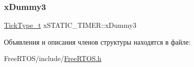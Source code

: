 \mbox{\label{structx_s_t_a_t_i_c___t_i_m_e_r_a60d582d1d0b5b9b15e8050d5ae29bc30}} 
\subsubsection{\texorpdfstring{xDummy3}{xDummy3}}
{\footnotesize\ttfamily \mbox{\hyperlink{portmacro_8h_aa69c48c6e902ce54f70886e6573c92a9}{Tick\+Type\+\_\+t}} x\+S\+T\+A\+T\+I\+C\+\_\+\+T\+I\+M\+E\+R\+::x\+Dummy3}



Объявления и описания членов структуры находятся в файле\+:\begin{DoxyCompactItemize}
\item 
Free\+R\+T\+O\+S/include/\mbox{\hyperlink{_free_r_t_o_s_8h}{Free\+R\+T\+O\+S.\+h}}\end{DoxyCompactItemize}

